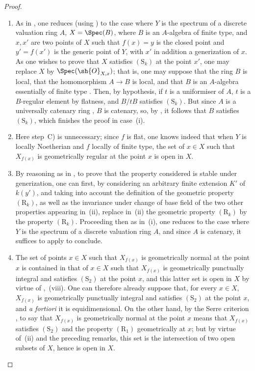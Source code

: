 \begin{proof}
\begin{enumerate}[label=(\roman*)]
  \item[(i)] As in , one reduces (using ) to the case where $Y$ is the spectrum of a discrete valuation ring $A$, $X=\Spec(B)$, where $B$ is an $A$-algebra of finite type, and $x,x'$ are two points of $X$ such that $f(x)=y$ is the closed point and $y'=f(x')$ is the generic point of $Y$, with $x'$ in addition a generization of $x$.
As one wishes to prove that $X$ satisfies $(\mathrm{S}_k)$ at the point $x'$, one may replace $X$ by $\Spec(\sh{O}_{X,x})$; that is, one may suppose that the ring $B$ is local, that the homomorphism $A\to B$ is local, and that $B$ is an $A$-algebra essentially of finite type .
Then, by hypothesis, if $t$ is a uniformiser of $A$, $t$ is a $B$-regular element by flatness, and $B/tB$ satisfies $(\mathrm{S}_k)$.
But since $A$ is a universally catenary ring , $B$ is catenary, so, by , it follows that $B$ satisfies $(\mathrm{S}_k)$, which finishes the proof in case~(i).

  \item[(iii)] Here step~C) is unnecessary; since $f$ is flat, one knows indeed  that when $Y$ is locally Noetherian and $f$ locally of finite type, the set of $x\in X$ such that $X_{f(x)}$ is geometrically regular at the point $x$ is open in $X$.

  \item[(ii)] By reasoning as in , to prove that the property considered is stable under generization, one can first, by considering an arbitrary finite extension $K'$ of $k(y')$, and taking into account the definition  of the geometric property $(\mathrm{R}_k)$, as well as the invariance under change of base field of the two other properties appearing in~(ii), replace in~(ii) the geometric property $(\mathrm{R}_k)$ by the property $(\mathrm{R}_k)$.
Proceeding then as in~(i), one reduces to the case where $Y$ is the spectrum of a discrete valuation ring $A$, and since $A$ is catenary, it suffices to apply  to conclude.

  \item[(iv)] The set of points $x\in X$ such that $X_{f(x)}$ is geometrically normal at the point $x$ is contained in that of $x\in X$ such that $X_{f(x)}$ is geometrically punctually integral and satisfies $(\mathrm{S}_2)$ at the point $x$, and this latter set is open in $X$ by virtue of ,~(viii).
One can therefore already suppose that, for every $x\in X$, $X_{f(x)}$ is geometrically punctually integral and satisfies $(\mathrm{S}_2)$ at the point $x$, and \emph{a fortiori} it is equidimensional.
On the other hand, by the Serre criterion , to say that $X_{f(x)}$ is geometrically normal at the point $x$ means that $X_{f(x)}$ satisfies $(\mathrm{S}_2)$ and the property $(\mathrm{R}_1)$ geometrically at $x$;
but by virtue of~(ii) and the preceding remarks, this set is the intersection of two open subsets of $X$, hence is open in $X$.
\end{enumerate}
\end{proof}

